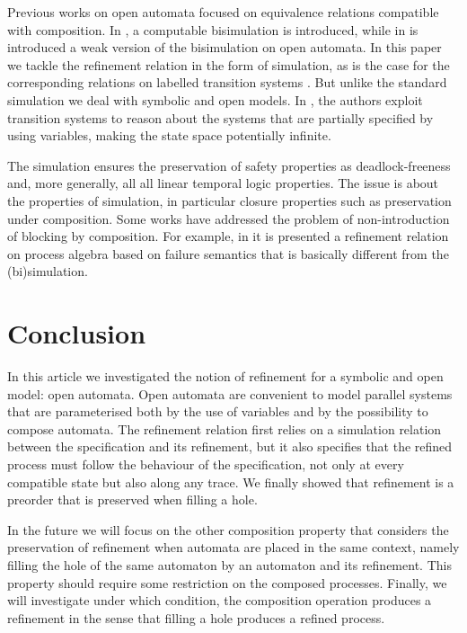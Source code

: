 \documentclass[runningheads]{llncs}
\begin{document}
 



Previous works on open automata focused on equivalence relations compatible with composition.
In  \cite{10.1145/3372884.3373161}, a computable bisimulation is introduced, while in \cite{fhbisim} is introduced a weak version of the bisimulation on open automata. 
In this paper we tackle the refinement relation in the form of simulation, as is the case for the corresponding relations on labelled transition systems \cite{10.1007/3-540-46428-X_19}. But unlike the standard simulation we deal with symbolic and open models. In \cite{Zhang2014}, the authors exploit transition systems to reason about the systems  that are partially specified by using variables, making  the state space potentially infinite.

The simulation  ensures the preservation of   
safety properties as deadlock-freeness  and, more generally, all 
all linear temporal logic properties.  The issue is about the properties of simulation, in particular closure properties such as preservation under composition. Some works   have addressed the problem of non-introduction of blocking by composition. For example, in \cite{DIHEGO2020110598} it is presented a refinement relation on process algebra based on failure semantics that is basically different from the (bi)simulation\cite{10.5555/640428.640430}.   
  
 





\section{Conclusion}\label{sec:ccl}
In this article we investigated the notion of refinement for a symbolic and open model: open automata. 
Open automata are convenient to model parallel systems that are parameterised both by the use of variables and by the possibility to compose automata.
The refinement relation first relies on a simulation relation between the specification and its refinement, but it also specifies that the refined process must follow the behaviour of the specification, not only at every compatible state but also along any trace.
We finally showed that refinement is a preorder that is preserved when filling a hole.

In the future we will focus on the other composition property that considers the preservation of refinement when automata are placed in the same context, namely filling the hole of the same automaton by an automaton and its refinement. This property should require some restriction on the composed processes.
 Finally, we will investigate under which condition, the composition operation produces a refinement in the sense that filling a hole produces a refined process.
\end{document}
